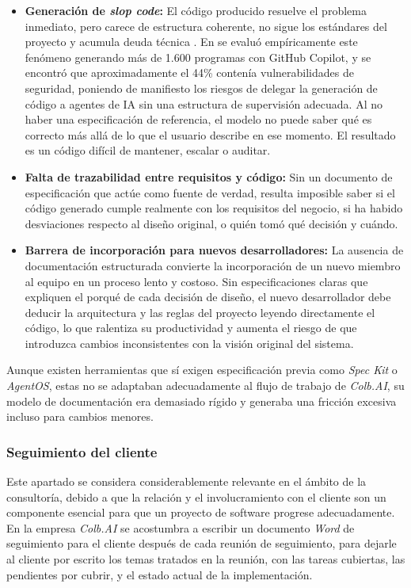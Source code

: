 \documentclass[11pt, letterpaper]{article}
\begin{document}
\begin{itemize}
    \item \textbf{Generación de \textit{slop code}:} El código producido resuelve el problema inmediato, pero carece de estructura coherente, no sigue los estándares del proyecto y acumula deuda técnica \cite{cunningham_1992_techdebt}. En \cite{pearce2022asleep} se evaluó empíricamente este fenómeno generando más de 1.600 programas con GitHub Copilot, y se encontró que aproximadamente el 44\% contenía vulnerabilidades de seguridad, poniendo de manifiesto los riesgos de delegar la generación de código a agentes de IA sin una estructura de supervisión adecuada. Al no haber una especificación de referencia, el modelo no puede saber qué es correcto más allá de lo que el usuario describe en ese momento. El resultado es un código difícil de mantener, escalar o auditar.

    \item \textbf{Falta de trazabilidad entre requisitos y código:} Sin un documento de especificación que actúe como fuente de verdad, resulta imposible saber si el código generado cumple realmente con los requisitos del negocio, si ha habido desviaciones respecto al diseño original, o quién tomó qué decisión y cuándo.

    \item \textbf{Barrera de incorporación para nuevos desarrolladores:} La ausencia de documentación estructurada convierte la incorporación de un nuevo miembro al equipo en un proceso lento y costoso. Sin especificaciones claras que expliquen el porqué de cada decisión de diseño, el nuevo desarrollador debe deducir la arquitectura y las reglas del proyecto leyendo directamente el código, lo que ralentiza su productividad y aumenta el riesgo de que introduzca cambios inconsistentes con la visión original del sistema.
\end{itemize}

Aunque existen herramientas que sí exigen especificación previa como \textit{Spec Kit} o \textit{AgentOS}, estas no se adaptaban adecuadamente al flujo de trabajo de \textit{Colb.AI}, su modelo de documentación era demasiado rígido y generaba una fricción excesiva incluso para cambios menores.

\subsubsection{Seguimiento del cliente}
\label{sec:ProblemaSeguimientoCliente}

Este apartado se considera considerablemente relevante en el ámbito de la consultoría, debido a que la relación y el involucramiento con el cliente son un componente esencial para que un proyecto de software progrese adecuadamente. En la empresa \textit{Colb.AI} se acostumbra a escribir un documento \textit{Word} de seguimiento para el cliente después de cada reunión de seguimiento, para dejarle al cliente por escrito los temas tratados en la reunión, con las tareas cubiertas, las pendientes por cubrir, y el estado actual de la implementación.
\end{document}
